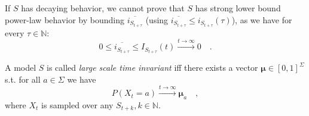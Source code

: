 \documentclass[../../main.tex]{subfiles}
\begin{document}
    \begin{remark}
        If $S$ has decaying behavior, we cannot prove that $S$ has strong lower bound power-law behavior by bounding $\overline{i_{S_{t + \tau}}}$ (using $\overline{i_{S_{t + \tau}}} \leq i_{S_{t + \tau}}(\tau)$), as we have for every $\tau \in \mathbb{N}$:
        \[
            0 \leq \overline{i_{S_{t + \tau}}} \leq I_{S_{t + \tau}}(t) \xrightarrow{t \to \infty} 0 \quad .
        \]
    \end{remark}

    \begin{definition}
        \label{definition:large_scale_time_invariance}
        A model $S$ is called \emph{large scale time invariant} iff there exists a vector $\bm{\mu} \in [0,1]^\Sigma$ s.t. for all $a \in \Sigma$ we have
        \[
            P(X_t = a) \xrightarrow{t \to \infty} \bm{\mu}_a \quad ,
        \]
        where $X_t$ is sampled over any $S_{t + k}, k \in \mathbb{N}$.
    \end{definition}
\end{document}

